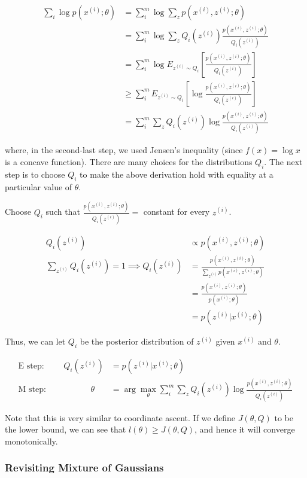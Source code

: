 \documentclass[letterpaper,10pt]{article}
\begin{document}
\begin{align}
\sum_i \log p(x^{(i)}; \theta) &= \sum_i^m \log \sum_z p(x^{(i)}, z^{(i)}; \theta)  \\
&= \sum_i^m \log \sum_z Q_i(z^{(i)}) \frac{p(x^{(i)}, z^{(i)}; \theta)}{Q_i(z^{(i)})} \\
&= \sum_i^m \log E_{z^{(i)} \sim Q_i} \left[ \frac{p(x^{(i)}, z^{(i)}; \theta)}{Q_i(z^{(i)})} \right] \\
&\geq \sum_i^m E_{z^{(i)} \sim Q_i} \left[ \log  \frac{p(x^{(i)}, z^{(i)}; \theta)}{Q_i(z^{(i)})} \right] \\
&= \sum_i^m \sum_z Q_i(z^{(i)}) \log \frac{p(x^{(i)}, z^{(i)}; \theta)}{Q_i(z^{(i)})}
\end{align}

where, in the second-last step, we used Jensen's inequality (since $f(x)=\log x$ is a concave function). There are many choices for the distributions $Q_i$. The next step is to choose $Q_i$ to make the above derivation hold with equality at a particular value of $\theta$.

Choose $Q_i$ such that $ \frac{p(x^{(i)}, z^{(i)}; \theta)}{Q_i(z^{(i)})} = $ constant for every $z^{(i)}$.

\begin{align}
Q_i(z^{(i)}) &\propto p(x^{(i)}, z^{(i)}; \theta) \\
\sum_{z^{(i)}} Q_i(z^{(i)}) = 1 \implies Q_i(z^{(i)}) &= \frac{p(x^{(i)}, z^{(i)}; \theta) }{\sum_{z^{(i)}} p(x^{(i)}, z^{(i)}; \theta) } \\
&= \frac{p(x^{(i)}, z^{(i)}; \theta) }{ p(x^{(i)} ; \theta) } \\
&= p(z^{(i)} | x^{(i)}; \theta)
\end{align}

Thus, we can let $Q_i$ be the posterior distribution of $z^{(i)}$ given $x^{(i)}$ and $\theta$.

\begin{align} 
\text{E step: }\qquad  Q_i (z^{(i)}) &= p(z^{(i)} | x^{(i)}; \theta) \\
\text{M step: } \qquad \quad \qquad \theta &= \arg \max_\theta \sum_i^m \sum_z Q_i(z^{(i)}) \log \frac{p(x^{(i)}, z^{(i)}; \theta)}{Q_i(z^{(i)})} \end{align}

Note that this is very similar to coordinate ascent. If we define $J(\theta,Q)$ to be the lower bound, we can see that $l(\theta) \geq J(\theta,Q)$, and hence it will converge monotonically.

\subsubsection{Revisiting Mixture of Gaussians}
\end{document}
